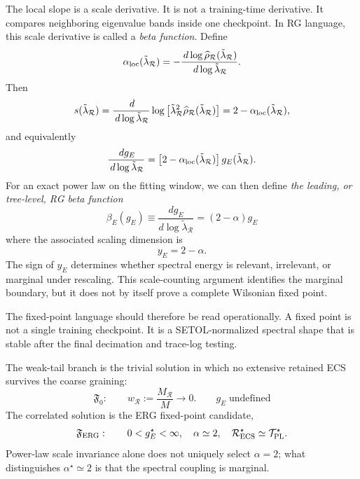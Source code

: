 \documentclass[10pt,twocolumn]{article}
\newcommand{\Fzero}{\mathfrak F_0}
\newcommand{\Ferg}{\mathfrak F_{\rm ERG}}
\newcommand{\dd}{\,d}
\newcommand{\Rell}{\mathcal R}
\newcommand{\rhohat}{\widehat\rho}
\begin{document}
The local slope is a scale derivative. It is not a training-time derivative. It compares neighboring eigenvalue bands inside one checkpoint. In RG language, this scale derivative is called a \emph{beta function}. Define
\begin{equation}
\alpha_{\rm loc}(\tilde{\lambda}_{\Rell})=
-\frac{\dd\log\rhohat_{\Rell}(\tilde{\lambda}_{\Rell})}{\dd\log\tilde{\lambda}_{\Rell}}.
\label{eq:alpha_loc}
\end{equation}
Then
\begin{equation}
s(\tilde{\lambda}_{\Rell})=\frac{\dd}{\dd\log\tilde{\lambda}_{\Rell}}
\log\left[\tilde{\lambda}_{\Rell}^2\rhohat_{\Rell}(\tilde{\lambda}_{\Rell})\right]
=2-\alpha_{\rm loc}(\tilde{\lambda}_{\Rell}),
\label{eq:slope_correct}
\end{equation}
and equivalently
\begin{equation}
\frac{\dd g_E}{\dd\log\tilde{\lambda}_{\Rell}}=
\left[2-\alpha_{\rm loc}(\tilde{\lambda}_{\Rell})\right]g_E(\tilde{\lambda}_{\Rell}).
\label{eq:beta_local}
\end{equation}
For an exact power law on the fitting window, we can then define
\emph{the leading, or tree-level, RG beta function} 
\begin{equation}
\beta_E(g_E)
\equiv
\frac{dg_E}{d\log\tilde{\lambda}_{\Rell}}
=
(2-\alpha)g_E 
\end{equation}
where the associated scaling dimension is
\begin{equation}
y_E = 2-\alpha .
\end{equation}
The sign of $y_E$ determines whether spectral energy is
relevant, irrelevant, or marginal under rescaling.
This scale-counting argument identifies the marginal
boundary, but it does not by itself prove a complete
Wilsonian fixed point.

The fixed-point language should therefore be read operationally. A fixed point is not a single training checkpoint.
It is a SETOL-normalized spectral shape that is stable  after the final decimation and trace-log testing.

The weak-tail branch is the trivial solution in which no extensive
retained ECS survives the coarse graining:
\begin{equation}
  \Fzero:
    \qquad
    w_{\Rell}
    :=
    \frac{M_{\Rell}}{M}
    \longrightarrow 0 .
        \qquad
g_E\;\text{undefined}
    \label{eq:trivial_rg_branch}
\end{equation}
The correlated solution is the ERG fixed-point candidate,
\begin{equation}
\Ferg:\qquad
0<g_E^\star<\infty,
\quad
\alpha\simeq2,
\quad
\Rell_{\rm ECS}^\star\simeq\mathcal T_{\rm PL}^\star.
\label{eq:FHTSR}
\end{equation}
Power-law scale invariance alone does not uniquely select $\alpha=2$;
what distinguishes $\alpha^\star\simeq2$ is that the spectral coupling
is marginal.
\end{document}
